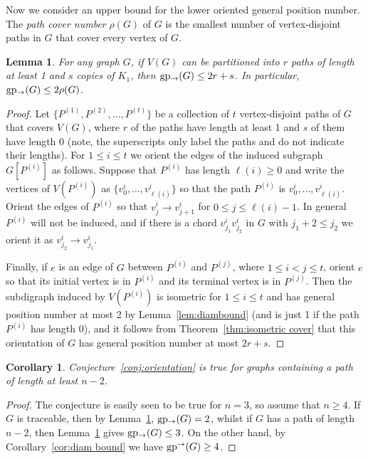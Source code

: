 \documentclass[a4paper,12pt]{article}
\newtheorem{lemma}[theorem]{Lemma}
\newtheorem{corollary}[theorem]{Corollary}
\theoremstyle{definition}
\newcommand{\ugp}{{\rm gp^{\rightarrow }}}
\newcommand{\lgp}{{\rm gp_{\rightarrow }}}
\begin{document}
	Now we consider an upper bound for the lower oriented general position number. The \emph{path cover number} $\rho (G)$ of $G$ is the smallest number of vertex-disjoint paths in $G$ that cover every vertex of $G$. 
	
	\begin{lemma}\label{lem:path cover bound}
		For any graph $G$, if $V(G)$ can be partitioned into $r$ paths of length at least 1 and $s$ copies of $K_1$, then $\lgp (G) \leq 2r+s$. In particular, $\lgp (G) \leq 2\rho (G)$.
	\end{lemma}
	\begin{proof}
		Let $\{ P^{(1)},P^{(2)},\ldots ,P^{(t)}\} $ be a collection of $t$ vertex-disjoint paths of $G$ that covers $V(G)$, where $r$ of the paths have length at least 1 and $s$ of them have length 0 (note, the superscripts only label the paths and do not indicate their lengths). For $1 \leq i \leq t$ we orient the edges of the induced subgraph $G[P^{(i)}]$ as follows. Suppose that $P^{(i)}$ has length $\ell (i) \geq 0$ and write the vertices of $V(P^{(i)})$ as $\{ v_0^i,\ldots ,v_{\ell (i)}^i\} $ so that the path $P^{(i)}$ is $v_0^i,\dots ,v_{\ell (i)}^i$. Orient the edges of $P^{(i)}$ so that $v_j^i \rightarrow v_{j+1}^i$ for $0 \leq j \leq \ell (i)-1$. In general $P^{(i)}$ will not be induced, and if there is a chord $v_{j_1}^iv_{j_2}^i$ in $G$ with $j_1 +2 \leq j_2$ we orient it as $v_{j_2}^i \rightarrow v_{j_1}^i$. 
		
		Finally, if $e$ is an edge of $G$ between $P^{(i)}$ and $P^{(j)}$, where $1 \leq i < j \leq t$, orient $e$ so that its initial vertex is in $P^{(i)}$ and its terminal vertex is in $P^{(j)}$. Then the subdigraph induced by $V(P^{(i)})$ is isometric for $1 \leq i \leq t$ and has general position number at most 2 by Lemma~\ref{lem:diambound} (and is just 1 if the path $P^{(i)}$ has length 0), and it follows from Theorem~\ref{thm:isometric cover} that this orientation of $G$ has general position number at most $2r+s$.
	\end{proof}
	
	\begin{corollary}\label{cor:true for long paths}
		Conjecture~\ref{conj:orientation} is true for graphs containing a path of length at least $n-2$.
	\end{corollary}
	\begin{proof}
		The conjecture is easily seen to be true for $n = 3$, so assume that $n \geq 4$. If $G$ is traceable, then by Lemma~\ref{lem:path cover bound}, $\lgp (G) = 2$, whilst if $G$ has a path of length $n-2$, then Lemma~\ref{lem:path cover bound} gives $\lgp (G) \leq 3$. On the other hand, by Corollary~\ref{cor:diam bound} we have $\ugp (G) \geq 4$. 
	\end{proof}
	
\end{document}

